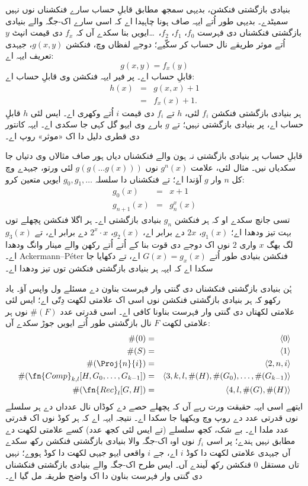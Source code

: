 \documentclass[../../../include/open-logic-section]{subfiles}
\begin{document}

بنیادی بازگشتی فنکشن، بدیہی سمجھ مطابق قابلِ حساب
سارے فنکشناں نوں نہیں سمیٹدے۔ بدیہی طور اُتے ایہہ
صاف ہونا چاہیدا اے کہ اسی سارے اک-جگہ والے بنیادی
بازگشتی فنکشناں دی فہرست
$f_0$، $f_1$، $f_2$،~\dots ایویں بنا سکدے آں
کہ $f_x$ دی قیمت انپٹ $y$ اُتے موثر طریقے نال
حساب کر سکّیے؛ دوجے لفظاں وچ، فنکشن $g(x,y)$،
جیہدی تعریف ایہہ اے:
\[
g(x,y) = f_x(y)
\]
قابلِ حساب اے۔ پر فیر ایہہ فنکشن وی قابلِ حساب اے:
\begin{eqnarray*}
h(x) & = & g(x,x) + 1 \\
& = & f_x(x) +1.
\end{eqnarray*}
ہر بنیادی بازگشتی فنکشن $f_i$ لئی، $h$ تے
$f_i$ دی قیمت $i$ اُتے وکھری اے۔ ایس لئی
$h$ قابلِ حساب اے، پر بنیادی بازگشتی نہیں؛ تے
$g$ بارے وی ایہو گل کہی جا سکدی اے۔ ایہہ کانتور
دی قطری دلیل دا اک «موثر» روپ اے۔

قابلِ حساب پر بنیادی بازگشتی نہ ہون والے فنکشناں
دیاں ہور صاف مثالاں وی دتیاں جا سکدیاں نیں۔ مثال
لئی، علامت $g^n(x)$ نوں $g(g(\dots g(x)))$
لئی ورتو، جیہدے وچ کل $n$ وار $g$ آؤندا اے؛
تے فنکشناں دا سلسلہ $g_0,g_1,\dots$ ایویں
متعین کرو:
\begin{eqnarray*}
g_0(x) & = & x+1 \\
g_{n + 1}(x) & = & g_n^x(x)
\end{eqnarray*}
تسی جانچ سکدے او کہ ہر فنکشن $g_n$ بنیادی
بازگشتی اے۔ ہر اگلا فنکشن پچھلے توں بہت تیز
ودھدا اے؛ $g_1(x)$، $2x$ دے برابر اے،
$g_2(x)$، $2^x \cdot x$ دے برابر اے، تے
$g_3(x)$ لگ بھگ $x$ واری $2$ نوں اک دوجے
دی قوت بنا کے اُتے اُتے رکھن والے مینار وانگ
ودھدا اے۔ Ackermann--P\'eter فنکشن بنیادی طور
اُتے $G(x) = g_x(x)$ اے، تے دکھایا جا سکدا اے
کہ ایہہ ہر بنیادی بازگشتی فنکشن توں تیز ودھدا اے۔

ہُن بنیادی بازگشتی فنکشناں دی گنتی وار فہرست
بناون دے مسئلے ول واپس آؤ۔ یاد رکھو کہ ہر
بنیادی بازگشتی فنکشن نوں اسی اک علامتی لکھت
دِتّی اے؛ ایس لئی علامتی لکھتاں دی گنتی وار فہرست
بناونا کافی اے۔ اسی قدرتی عدد $\#(F)$ نوں
ہر علامتی لکھت $F$ نال بازگشتی طور اُتے ایویں
جوڑ سکدے آں:
\begin{eqnarray*}
\#(0) & = & \langle 0 \rangle \\
\#(S) & = & \langle 1 \rangle \\
\#(\Proj{n}{i}) & = & \langle 2, n, i \rangle \\
\#(\fn{Comp}_{k,l}[H,G_0,\dots,G_{k-1}]) & = & \langle
3,k,l,\#(H),\#(G_0),\dots,\#(G_{k-1}) \rangle \\
\#(\fn{Rec}_l[G,H]) & = & \langle 4, l, \#(G), \#(H) \rangle
\end{eqnarray*}
ایتھے اسی ایہہ حقیقت ورت رہے آں کہ پچھلے حصے دے
کوڈاں نال عدداں دے ہر سلسلے نوں قدرتی عدد دے
روپ وچ ویکھیا جا سکدا اے۔ نتیجہ ایہہ اے کہ ہر
کوڈ نوں اک قدرتی عدد ملدا اے۔ بے شک، کجھ سلسلے
(تے ایس لئی کجھ عدد) کسے علامتی لکھت دے مطابق
نہیں ہندے؛ پر اسی $f_i$ نوں اوہ اک-جگہ والا
بنیادی بازگشتی فنکشن رکھ سکدے آں جیہدی علامتی
لکھت دا کوڈ $i$ اے، جے $i$ واقعی ایہو جیہی
لکھت دا کوڈ ہووے؛ نہیں تاں مستقل $0$ فنکشن
رکھ لَیندے آں۔ ایس طرح اک-جگہ والے بنیادی
بازگشتی فنکشناں دی گنتی وار فہرست بناون دا اک
واضح طریقہ مل گیا اے۔
\end{document}
